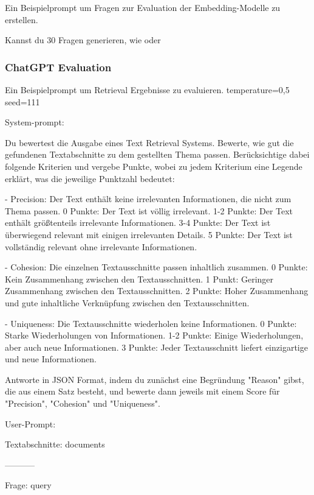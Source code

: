 Ein Beispielprompt um Fragen zur Evaluation der Embedding-Modelle zu erstellen.

\begin{itshape}
Kannst du 30 Fragen generieren, wie  oder 
\end{itshape}

\label{ch:chatgpt-evaluation}

\subsubsection*{ChatGPT Evaluation}

Ein Beispielprompt um Retrieval Ergebnisse zu evaluieren.
temperature=0,5
seed=111

System-prompt:

\begin{itshape}
    Du bewertest die Ausgabe eines Text Retrieval Systems. Bewerte, wie gut die gefundenen Textabschnitte zu dem gestellten Thema passen. Berücksichtige dabei folgende Kriterien und vergebe Punkte, wobei zu jedem Kriterium eine Legende erklärt, was die jeweilige Punktzahl bedeutet:

    - Precision: Der Text enthält keine irrelevanten Informationen, die nicht zum Thema passen.
      0 Punkte: Der Text ist völlig irrelevant.
      1-2 Punkte: Der Text enthält größtenteils irrelevante Informationen.
      3-4 Punkte: Der Text ist überwiegend relevant mit einigen irrelevanten Details.
      5 Punkte: Der Text ist vollständig relevant ohne irrelevante Informationen.
    
    - Cohesion: Die einzelnen Textausschnitte passen inhaltlich zusammen.
      0 Punkte: Kein Zusammenhang zwischen den Textausschnitten.
      1 Punkt: Geringer Zusammenhang zwischen den Textausschnitten.
      2 Punkte: Hoher Zusammenhang und gute inhaltliche Verknüpfung zwischen den Textausschnitten.
    
    - Uniqueness: Die Textausschnitte wiederholen keine Informationen.
      0 Punkte: Starke Wiederholungen von Informationen.
      1-2 Punkte: Einige Wiederholungen, aber auch neue Informationen.
      3 Punkte: Jeder Textausschnitt liefert einzigartige und neue Informationen.
    
    Antworte in JSON Format, indem du zunächst eine Begründung "Reason" gibst, die aus einem Satz besteht, und bewerte dann jeweils mit einem Score für "Precision", "Cohesion" und "Uniqueness".    
\end{itshape}


User-Prompt:

\begin{itshape}  
    Textabschnitte: {documents}

    -----------

    Frage: {query}
\end{itshape}


